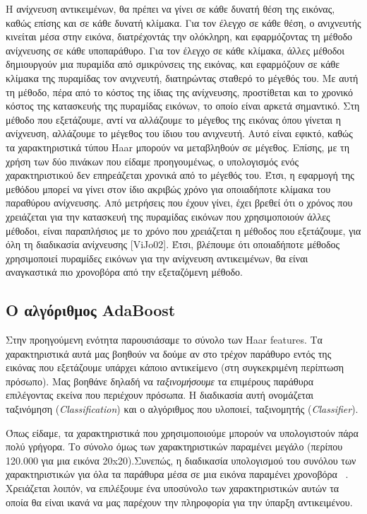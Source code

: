 Η ανίχνευση αντικειμένων, θα πρέπει να γίνει σε κάθε δυνατή θέση της εικόνας, καθώς επίσης
και σε κάθε δυνατή κλίμακα. Για τον έλεγχο σε κάθε θέση, ο ανιχνευτής κινείται μέσα στην εικόνα,
διατρέχοντάς την ολόκληρη, και εφαρμόζοντας τη μέθοδο ανίχνευσης σε κάθε υποπαράθυρο. Για
τον έλεγχο σε κάθε κλίμακα, άλλες μέθοδοι δημιουργούν μια πυραμίδα από σμικρύνσεις της
εικόνας, και εφαρμόζουν σε κάθε κλίμακα της πυραμίδας τον ανιχνευτή, διατηρώντας σταθερό το
μέγεθός του. Με αυτή τη μέθοδο, πέρα από το κόστος της ίδιας της ανίχνευσης, προστίθεται και
το χρονικό κόστος της κατασκευής της πυραμίδας εικόνων, το οποίο είναι αρκετά σημαντικό. Στη
μέθοδο που εξετάζουμε, αντί να αλλάζουμε το μέγεθος της εικόνας όπου γίνεται η ανίχνευση,
αλλάζουμε το μέγεθος του ίδιου του ανιχνευτή. Αυτό είναι εφικτό, καθώς τα χαρακτηριστικά τύπου
Haar μπορούν να μεταβληθούν σε μέγεθος. Επίσης, με τη χρήση των δύο πινάκων που είδαμε
προηγουμένως, ο υπολογισμός ενός χαρακτηριστικού δεν επηρεάζεται χρονικά από το μέγεθός
του. Έτσι, η εφαρμογή της μεθόδου μπορεί να γίνει στον ίδιο ακριβώς χρόνο για οποιαδήποτε
κλίμακα του παραθύρου ανίχνευσης. Από μετρήσεις που έχουν γίνει, έχει βρεθεί ότι ο χρόνος που
χρειάζεται για την κατασκευή της πυραμίδας εικόνων που χρησιμοποιούν άλλες μέθοδοι, είναι
παραπλήσιος με το χρόνο που χρειάζεται η μέθοδος που εξετάζουμε, για όλη τη διαδικασία
ανίχνευσης [ViJo02]. Έτσι, βλέπουμε ότι οποιαδήποτε μέθοδος χρησιμοποιεί πυραμίδες εικόνων
για την ανίχνευση αντικειμένων, θα είναι αναγκαστικά πιο χρονοβόρα από την εξεταζόμενη
μέθοδο.

\subsection{Ο αλγόριθμος AdaBoost}

Στην προηγούμενη ενότητα παρουσιάσαμε το σύνολο των Haar features. Tα χαρακτηριστικά
αυτά μας βοηθούν να δούμε αν στο τρέχον παράθυρο
εντός της εικόνας που εξετάζουμε υπάρχει κάποιο αντικείμενο (στη συγκεκριμένη
περίπτωση πρόσωπο). Μας βοηθάνε δηλαδή να \emph{ταξινομήσουμε} τα επιμέρους παράθυρα
επιλέγοντας εκείνα που περιέχουν πρόσωπα. Η διαδικασία αυτή ονομάζεται ταξινόμηση
(\emph{Classification}) και ο αλγόριθμος που υλοποιεί, ταξινομητής (\emph{Classifier}).

Όπως είδαμε, τα χαρακτηριστικά που χρησιμοποιούμε μπορούν να υπολογιστούν πάρα πολύ
γρήγορα. Το σύνολο όμως των χαρακτηριστικών παραμένει μεγάλο (περίπου 120.000 για μια
εικόνα 20x20).Συνεπώς, η διαδικασία υπολογισμού του συνόλου των χαρακτηριστικών
για όλα τα παράθυρα μέσα σε μια εικόνα παραμένει χρονοβόρα ~\cite{Viola01rapidobject}.
Χρειάζεται λοιπόν, να επιλέξουμε ένα υποσύνολο των χαρακτηριστικών αυτών τα οποία θα
είναι ικανά να μας παρέχουν την πληροφορία για την ύπαρξη αντικειμένου.

